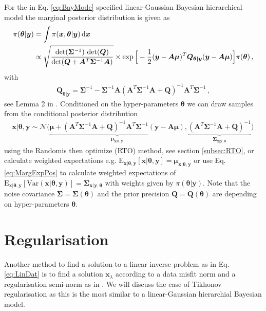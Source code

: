 For the in Eq. \ref{eq:BayMode} specified linear-Gaussian Bayesian hierarchical model the marginal posterior distribution is given as
\begin{align}
	\pi(\bm{\theta} | \bm{y}) &= \int \pi(\bm{x}, \bm{\theta} | \bm{y}) \mathop{}\!\mathrm{d} \bm{x} \\ 
	\label{eq:condHyper}
	&\propto \sqrt{ \frac{ \det( \bm{\Sigma}^{-1} ) \,  \det( \bm{Q}) }{\det( \bm{Q} + \bm{A}^T \bm{\Sigma}^{-1} \bm{A} ) } } \times \exp \Big[ - \frac{1}{2}(\bm{y} -\bm{A \mu})^T \bm{Q}_{\bm{\theta|y}} (\bm{y} -\bm{A \mu}) \Big] \pi(\bm{\theta}) \, ,
\end{align}
with
\begin{align}
	\bm{Q}_{\bm{\theta|y}} = \bm{\Sigma}^{-1} - \bm{\Sigma}^{-1} \bm{A} (\bm{A}^T \bm{\Sigma}^{-1} \bm{A} + \bm{Q} )^{-1} \bm{A}^T \bm{\Sigma}^{-1} \,  ,
\end{align}
see Lemma 2 in \cite{fox2016fast}.
Conditioned on the hyper-parameters $\bm{\theta}$ we can draw samples from the conditional posterior distribution
\begin{align}
	\bm{x}| \bm{\theta}, \bm{y}  \sim \mathcal{N}\big( \underbrace{\bm{\mu} + (\bm{A}^T \bm{\Sigma}^{-1} \bm{A} + \bm{Q} )^{-1} \bm{A}^T \bm{\Sigma}^{-1} (\bm{y} - \bm{A} \bm{\mu})}_{\bm{\mu}_{\bm{x}|  \bm{\theta}, \bm{y}}} , \underbrace{ (\bm{A}^T \bm{\Sigma}^{-1} \bm{A} + \bm{Q} )^{-1}}_{\bm{\Sigma}_{\bm{x}| \bm{y} , \bm{\theta}}} \big) \, 
\end{align}
using the Randomis then optimize (RTO) method, see section \ref{subsec:RTO},
or calculate weighted expectations e.g. $ \text{E}_{\bm{x}|\bm{\theta},\bm{y}} [\bm{x}| \bm{\theta}, \bm{y}] = \bm{\mu}_{\bm{x}| \bm{\theta}, \bm{y} }$ or use Eq. \ref{eq:MargExpPos} to calculate weighted expectations of $\text{E}_{\bm{x}|\bm{\theta},\bm{y}} [\text{Var}(\bm{x}| \bm{\theta}, \bm{y})]  = \bm{\Sigma}_{\bm{x}| \bm{y} , \bm{\theta}}$ with weights given by $\pi(\bm{\theta} | \bm{y} )$.
Note that the noise covariance $\bm{\Sigma}= \bm{\Sigma}( \bm{\theta}) $ and the prior precision $\bm{Q} = \bm{Q}( \bm{\theta})$ are depending on hyper-parameters $\bm{\theta}$.

\section{Regularisation}
\label{sec:reg}
Another method to find a solution to a linear inverse problem as in Eq. \ref{eq:LinDat} is to find a solution $\bm{x}_{\lambda}$ according to a data misfit norm and a regularisation semi-norm as in \cite{fox2016fast}.
We will discuss the case of Tikhonov regularisation \cite{kaipio2005statinv,tan2016LecNot} as this is the most similar to a linear-Gaussian hierarchial Bayesian model.

